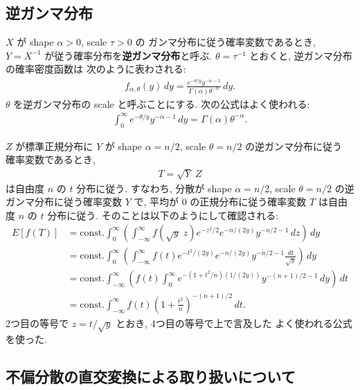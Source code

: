 \documentclass[12pt,twoside]{jarticle}
\theoremstyle{jplain}
\theoremstyle{jplain}
\theoremstyle{jplain}
\numberwithin{theorem}{section}
\numberwithin{equation}{section}
\numberwithin{figure}{section}
\numberwithin{table}{section}
\begin{document}

\subsection{逆ガンマ分布}
\label{sec:InverseGamma}

$X$ が shape $\alpha > 0$, scale $\tau > 0$ の
ガンマ分布に従う確率変数であるとき,
$Y=X^{-1}$ が従う確率分布を{\bfseries 逆ガンマ分布}と呼ぶ.
$\theta = \tau^{-1}$ とおくと, 逆ガンマ分布の確率密度函数は
次のように表わされる:
\begin{align*}
  f_{\alpha,\theta}(y)\,dy
  = \frac{e^{-\theta/y} y^{-\alpha-1}}{\Gamma(\alpha)\theta^{-\alpha}}
  \,dy.
\end{align*}
$\theta$ を逆ガンマ分布の scale と呼ぶことにする. 次の公式はよく使われる:
\begin{align*}
  \int_0^\infty e^{-\theta/y} y^{-\alpha-1}\,dy
  =\Gamma(\alpha)\theta^{-\alpha}.
\end{align*}

$Z$ が標準正規分布に
$Y$ が shape $\alpha = n/2$, scale $\theta = n/2$ の逆ガンマ分布に従う
確率変数であるとき,
\begin{align*}
  T = \sqrt{Y}\;Z
\end{align*}
は自由度 $n$ の $t$ 分布に従う. すなわち, 分散が shape $\alpha=n/2$,
scale $\theta=n/2$ の逆ガンマ分布に従う確率変数 $Y$ で,
平均が $0$ の正規分布に従う確率変数 $T$ は自由度 $n$ の $t$ 分布に従う.
そのことは以下のようにして確認される:
\begin{align*}
  E[f(T)]
  &
  =\text{const.}\int_0^\infty\left(
  \int_{-\infty}^\infty f\left(\sqrt{y}\;z\right)
  e^{-z^2/2}e^{-n/(2y)}y^{-n/2-1}\,dz
  \right)\,dy
  \\ &
  =\text{const.}\int_0^\infty\left(
  \int_{-\infty}^\infty f(t)
  e^{-t^2/(2y)}e^{-n/(2y)}y^{-n/2-1}\frac{dt}{\sqrt{y}}
  \right)\,dy
  \\ &
  =\text{const.}\int_{-\infty}^\infty\left(
   f(t)\int_0^\infty e^{-(1+t^2/n)(1/(2y))}y^{-(n+1)/2-1}\,dy
  \right)\,dt
  \\ &
  = \text{const.}\int_{-\infty}^\infty
  f(t) \left(1+\frac{t^2}{n}\right)^{-(n+1)/2}\,dt.
\end{align*}
2つ目の等号で $z=t/\sqrt{y}$ とおき, 4つ目の等号で上で言及した
よく使われる公式を使った.


\subsection{不偏分散の直交変換による取り扱いについて}
\label{sec:Y_k}
\end{document}
